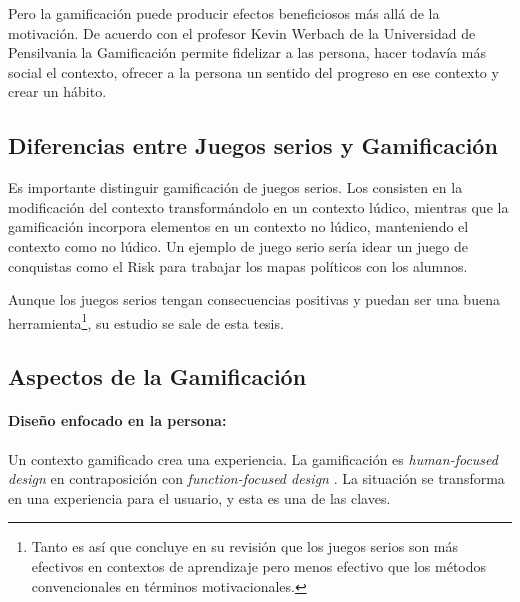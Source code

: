 Pero la gamificación puede producir efectos beneficiosos más allá de la motivación.
% 
De acuerdo con el profesor Kevin Werbach de la Universidad de Pensilvania la Gamificación permite fidelizar a las persona, hacer todavía más social el contexto, ofrecer a la persona un sentido del progreso en ese contexto y crear un hábito.


\subsection{Diferencias entre Juegos serios y Gamificación}

Es importante distinguir gamificación de juegos serios. Los  consisten en la modificación del contexto transformándolo en un contexto lúdico, mientras que la gamificación incorpora elementos en un contexto no lúdico, manteniendo el contexto como no lúdico.
%
Un ejemplo de juego serio sería idear un juego de conquistas como el Risk para trabajar los mapas políticos con los alumnos. 

Aunque los juegos serios tengan consecuencias positivas y puedan ser una buena herramienta\footnote{Tanto es así que \cite{MetaSerious} concluye en su revisión que los juegos serios son más efectivos en contextos de aprendizaje pero menos efectivo que los métodos convencionales en términos motivacionales.}, su estudio se sale de esta tesis.

\subsection{Aspectos de la Gamificación}

\paragraph{Diseño enfocado en la persona:} 
Un contexto gamificado crea una experiencia.
%
La gamificación es \textit{human-focused design} en contraposición con \textit{function-focused design} \cite{BeyondPBL}.
%
La situación se transforma en una experiencia para el usuario, y esta es una de las claves.

